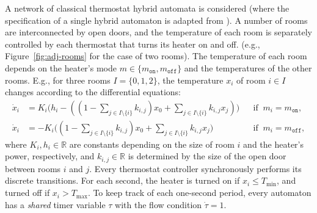 A network of classical thermostat hybrid automata is considered 
(where the specification of a single hybrid automaton is adapted from \cite{henzinger2000theory}). 
A number of rooms are interconnected by open doors,
and the temperature of each room is separately controlled by each thermostat
that turns its heater on and off.
(e.g., Figure~\ref{fig:adj-rooms}  for the case of two rooms).
The temperature of each room depends on
the heater's mode $m \in \{m_\texttt{on}, m_\texttt{off}\}$  and the temperatures of the other rooms.
E.g., for three rooms $I = \{0,1,2\}$, 
the temperature $x_i$ of room $i \in I$
changes according to the differential equations:
\[
\begin{aligned}
\dot{x}_i &= K_i \big(h_i - ((1- \textstyle\sum_{j \in I \setminus \{i\}} k_{i,j}) x_0 + \sum_{j \in I \setminus \{i\}} k_{i,j}  x_j)\big)
&& \mbox{if}\;\; m_i = m_\texttt{on},
\\
\dot{x}_i &= - K_i \big((1- \textstyle\sum_{j \in I \setminus \{i\}} k_{i,j}) x_0 + \sum_{j \in I \setminus \{i\}} k_{i,j}  x_j\big)
&& \mbox{if}\;\; m_i = m_\texttt{off},
\end{aligned}
\]
where $K_i, h_i \in \mathbb{R}$ are constants depending on
the size of room $i$ and the heater's power, respectively,
and $k_{i,j} \in \mathbb{R}$ is determined by the size of the open door between rooms $i$ and $j$.
%
Every thermostat controller synchronously performs its discrete transitions.
For each second, 
the heater is turned on if $x_i \leq T_{\min}$,
and turned off if $x_i > T_{\max}$.
To keep track of each one-second period,
every automaton has a \emph{shared} timer variable $\tau$ 
with the flow condition $\dot{\tau} = 1$.



